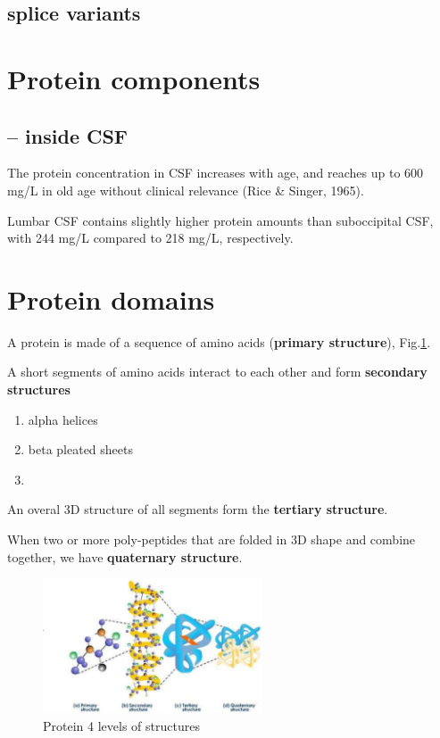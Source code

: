 \subsection{splice variants}
\label{sec:splice-variant}



\section{Protein components}
\label{sec:protein-components}

\subsection{-- inside CSF}
\label{sec:protein-components-CSF}

The protein concentration in CSF increases with age, and reaches up to 600 mg/L
in old age without clinical relevance (Rice \& Singer, 1965).

Lumbar CSF contains slightly higher protein amounts than suboccipital CSF, with
244 mg/L compared to 218 mg/L, respectively.


\section{Protein domains}

A protein is made of a sequence of amino acids ({\bf primary structure}),
Fig.\ref{fig:protein-structure-4-levels}.

A short segments of amino acids interact to each other and form {\bf secondary
structures}
\begin{enumerate}
  \item alpha helices
  
  \item beta pleated sheets
  
  \item 
\end{enumerate}

An overal 3D structure of all segments form the {\bf tertiary structure}.

When two or more poly-peptides that are folded in 3D shape and combine together,
we have {\bf quaternary structure}.

\begin{figure}[hbt]
  \centerline{\includegraphics[height=4cm,
    angle=0]{./images/protein-structure-4-levels.eps}}
  \caption{Protein 4 levels of structures}
  \label{fig:protein-structure-4-levels}
\end{figure}


